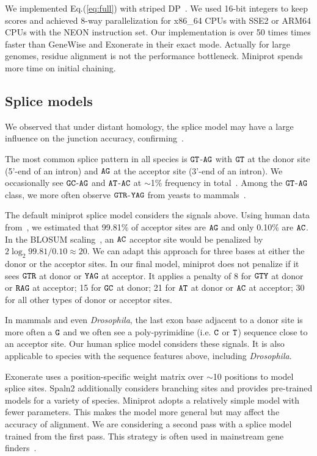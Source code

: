 \documentclass{bioinfo}
\begin{document}
\begin{methods}
We implemented Eq.(\ref{eq:full}) with striped DP~\citep{Farrar:2007hs}.
We used 16-bit integers to keep scores and achieved 8-way parallelization
for x86\_64 CPUs with SSE2 or ARM64 CPUs with the NEON instruction set.
Our implementation is over 50 times times faster than GeneWise and Exonerate in
their exact mode. Actually for large genomes, residue alignment is not the
performance bottleneck. Miniprot spends more time on initial chaining.

\subsection{Splice models}

We observed that under distant homology, the splice model may have a large
influence on the junction accuracy, confirming~\citet{Iwata:2012aa}.

The most common splice pattern in all species is ${\tt GT}$-${\tt AG}$ with
${\tt GT}$ at the donor site (5'-end of an intron) and ${\tt AG}$ at the
acceptor site (3'-end of an intron). We occasionally see ${\tt GC}$-${\tt AG}$
and ${\tt AT}$-${\tt AC}$ at $\sim$1\% frequency in total~\citep{Sheth:2006vg}.
Among the ${\tt GT}$-${\tt AG}$ class, we more often observe ${\tt GTR}$-${\tt
YAG}$ from yeasts to mammals~\citep{Irimia:2008aa}.

The default miniprot splice model considers the signals above. Using human data
from~\citet{Sibley:2016vh}, we estimated that 99.81\% of acceptor sites are ${\tt
AG}$ and only 0.10\% are ${\tt AC}$. In the BLOSUM
scaling~\citep{Henikoff:1992tk}, an ${\tt AC}$ acceptor site would be penalized
by $2\log_2 99.81/0.10\approx 20$. We can adapt this approach for three bases at
either the donor or the acceptor sites. In our final model, miniprot does not
penalize if it sees ${\tt GTR}$ at donor or ${\tt YAG}$ at acceptor. It applies
a penalty of 8 for ${\tt GTY}$ at donor or ${\tt RAG}$ at acceptor; 15 for
${\tt GC}$ at donor; 21 for ${\tt AT}$ at donor or ${\tt AC}$ at acceptor; 30
for all other types of donor or acceptor sites.

In mammals and even \emph{Drosophila}, the last exon base adjacent to a donor site
is more often a ${\tt G}$ and we often see a poly-pyrimidine (i.e. ${\tt C}$ or
${\tt T}$) sequence close to an acceptor site. Our human splice model
considers these signals. It is also applicable to species with the sequence
features above, including \emph{Drosophila}.

Exonerate uses a position-specific weight matrix over $\sim$10 positions to
model splice sites. Spaln2 additionally considers branching sites and provides
pre-trained models for a variety of species. Miniprot adopts a relatively
simple model with fewer parameters. This makes the model more general but may
affect the accuracy of alignment. We are considering a second pass with a
splice model trained from the first pass. This strategy is often used in
mainstream gene finders~\citep{Bruna:2021ug}.


\end{methods}
\end{document}
